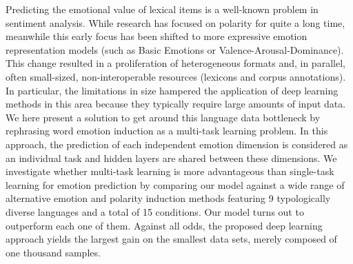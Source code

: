 Predicting the emotional value of lexical items is a well-known problem in sentiment analysis. While research has focused on polarity for quite a long time, meanwhile this early focus has been shifted to more expressive emotion representation models (such as Basic Emotions or Valence-Arousal-Dominance). This change resulted in a proliferation of heterogeneous formats and, in parallel, often small-sized, non-interoperable resources (lexicons and corpus annotations). In particular, the limitations in size hampered the application of deep learning methods in this area because they typically require large amounts of input data. We here present a solution to get around this language data bottleneck by rephrasing word emotion induction as a multi-task learning problem. In this approach, the prediction of each independent emotion dimension is considered as an individual task and hidden layers are shared between these dimensions. We investigate whether multi-task learning is more advantageous than single-task learning for emotion prediction  by comparing our model against a wide range of alternative emotion and polarity induction methods featuring 9 typologically diverse languages and a total of 15 conditions. Our model turns out to outperform each one of them. Against all odds, the proposed deep learning approach yields the largest gain on the smallest data sets, merely composed of one thousand samples.
